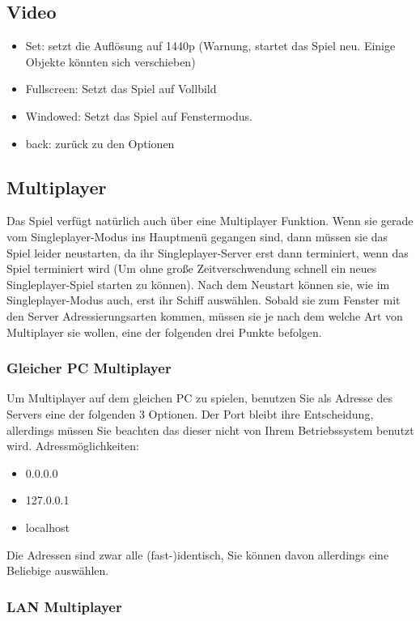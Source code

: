 \documentclass[fontsize=12pt,paper=a4,twoside]{scrartcl}
\begin{document}
\subsection{Video}
\begin{itemize}
\item Set: setzt die Auflösung auf 1440p (Warnung, startet das Spiel neu. Einige Objekte könnten sich verschieben)
\item Fullscreen: Setzt das Spiel auf Vollbild
\item Windowed: Setzt das Spiel auf Fenstermodus.
\item back: zurück zu den Optionen
\end{itemize}


\subsection{Multiplayer}

Das Spiel verfügt natürlich auch über eine Multiplayer Funktion. Wenn sie gerade vom Singleplayer-Modus ins Hauptmenü gegangen sind, dann müssen sie das Spiel leider neustarten, da ihr Singleplayer-Server erst dann terminiert, wenn das Spiel terminiert wird (Um ohne große Zeitverschwendung schnell ein neues Singleplayer-Spiel starten zu können). Nach dem Neustart können sie, wie im Singleplayer-Modus auch, erst ihr Schiff auswählen. Sobald sie zum Fenster mit den Server Adressierungsarten kommen, müssen sie je nach dem welche Art von Multiplayer sie wollen, eine der folgenden drei Punkte befolgen.

\subsubsection{Gleicher PC Multiplayer}
Um Multiplayer auf dem gleichen PC zu spielen, benutzen Sie als Adresse des Servers eine der folgenden 3 Optionen. Der Port bleibt ihre Entscheidung, allerdings müssen Sie beachten das dieser nicht von Ihrem Betriebssystem benutzt wird. 
Adressmöglichkeiten:
\begin{itemize}
\item 0.0.0.0
\item 127.0.0.1
\item localhost
\end{itemize}

Die Adressen sind zwar alle (fast-)identisch, Sie können davon allerdings eine Beliebige auswählen.

\subsubsection{LAN Multiplayer}
\end{document}
